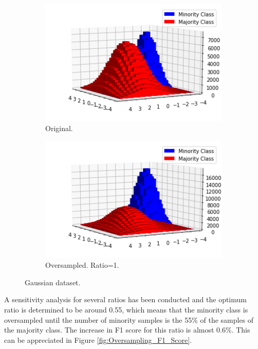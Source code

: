\documentclass[conference]{IEEEtran}
\begin{document}
	
		\begin{figure}
		\centering
		\begin{subfigure}[b]{0.24\textwidth}
			\centering
			\includegraphics[width=\textwidth]{Oversampling_2D_OriginalDataset}
			\caption{Original.}
			\label{fig:Oversampling_2D_OriginalDataset}
		\end{subfigure}
		\hfill
		\begin{subfigure}[b]{0.24\textwidth}
			\centering
			\includegraphics[width=\textwidth]{Oversampling_2D_OversampledDataset}
			\caption{Oversampled. Ratio=1.}
			\label{fig:Oversampling_2D_OversampledDataset}
		\end{subfigure}
		\caption{Gaussian dataset.}
		\label{fig:Oversampling_2D_OriginalHistograms}
	\end{figure}
	
	A sensitivity analysis for several ratios has been conducted and the optimum ratio is determined to be around 0.55, which means that the minority class is oversampled until the number of minority samples is the 55\% of the samples of the majority class. The increase in F1 score for this ratio is almost 0.6\%. This can be appreciated in Figure \ref{fig:Oversampling_F1_Score}. 
	
\end{document}
